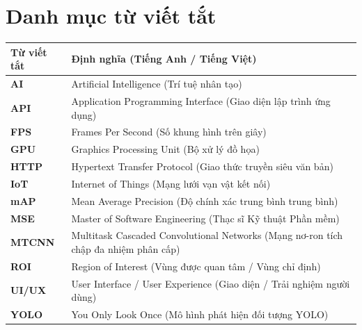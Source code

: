 \documentclass[12pt,a4paper]{article}
\begin{document}
\newpage

\tableofcontents
\newpage

\section*{Danh mục từ viết tắt}

\begin{longtable}{ll}
\toprule
\textbf{Từ viết tắt} & \textbf{Định nghĩa (Tiếng Anh / Tiếng Việt)} \\
\midrule
\endhead
\textbf{AI} & Artificial Intelligence (Trí tuệ nhân tạo) \\
\textbf{API} & Application Programming Interface (Giao diện lập trình ứng dụng) \\
\textbf{FPS} & Frames Per Second (Số khung hình trên giây) \\
\textbf{GPU} & Graphics Processing Unit (Bộ xử lý đồ họa) \\
\textbf{HTTP} & Hypertext Transfer Protocol (Giao thức truyền siêu văn bản) \\
\textbf{IoT} & Internet of Things (Mạng lưới vạn vật kết nối) \\
\textbf{mAP} & Mean Average Precision (Độ chính xác trung bình trung bình) \\
\textbf{MSE} & Master of Software Engineering (Thạc sĩ Kỹ thuật Phần mềm) \\
\textbf{MTCNN} & Multitask Cascaded Convolutional Networks (Mạng nơ-ron tích chập đa nhiệm phân cấp) \\
\textbf{ROI} & Region of Interest (Vùng được quan tâm / Vùng chỉ định) \\
\textbf{UI/UX} & User Interface / User Experience (Giao diện / Trải nghiệm người dùng) \\
\textbf{YOLO} & You Only Look Once (Mô hình phát hiện đối tượng YOLO) \\
\bottomrule
\end{longtable}

\newpage

\end{document}
